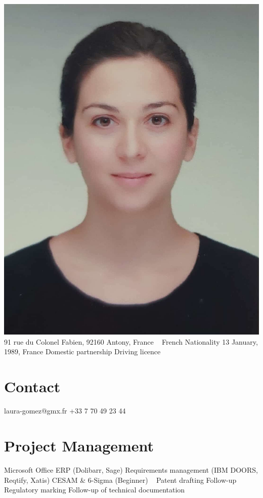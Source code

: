 \documentclass{cv-style}     %
\begin{document}


\begin{aside}
    \includegraphics[width=.8\columnwidth]{img/LG}
    91 rue du Colonel Fabien, 92160 Antony, France
    ~
    French Nationality
    13 January, 1989, France
    Domestic partnership
    Driving licence
    \section{Contact}
    laura-gomez@gmx.fr
    +33 7 70 49 23 44    
    \section{Project Management}
    Microsoft Office
    ERP (Dolibarr, Sage)
    Requirements management (IBM DOORS, Reqtify, Xatis)
    CESAM \& 6-Sigma (Beginner)
    ~
    Patent drafting
    Follow-up Regulatory marking
    Follow-up of technical documentation

\end{aside}
\end{document}
